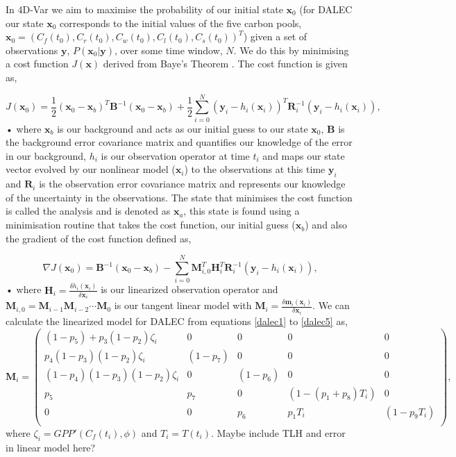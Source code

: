 \documentclass[11pt]{article}
\begin{document}
In 4D-Var we aim to maximise the probability of our initial state $\textbf{x}_0$ (for DALEC our state $\textbf{x}_0$ corresponds to the initial values of the five carbon pools,  $\textbf{x}_0 = (C_f(t_0), C_r(t_0), C_w(t_0), C_l(t_0), C_s(t_0))^T$) given a set of observations $\textbf{y}$, $P(\textbf{x}_0|\textbf{y})$, over some time window, $N$. We do this by minimising a cost function $J(\textbf{x})$ derived from Baye's Theorem \cite{lewis2006dynamic}. The cost function is given as,

\begin{equation}
J(\textbf{x}_0) = \frac{1}{2}(\textbf{x}_0-\textbf{x}_b)^{T}\textbf{B}^{-1}(\textbf{x}_0-\textbf{x}_b)+\frac{1}{2}\sum_{i=0}^{N}(\textbf{y}_i-h_i(\textbf{x}_i))^{T}\textbf{R}_{i}^{-1}(\textbf{y}_i-h_i(\textbf{x}_i)),
\end{equation}•
where $\textbf{x}_b$ is our background and acts as our initial guess to our state $\textbf{x}_0$, $\textbf{B}$ is the background error covariance matrix and quantifies our knowledge of the error in our background, $h_i$ is our observation operator at time $t_i$ and maps our state vector evolved by our nonlinear model ($\textbf{x}_i$) to the observations at this time $\textbf{y}_i$ and $\textbf{R}_i$ is the observation error covariance matrix and represents our knowledge of the uncertainty in the observations. The state that minimises the cost function is called the analysis and is denoted as $\textbf{x}_a$, this state is found using a minimisation routine that takes the cost function, our initial guess ($\textbf{x}_b$) and also the gradient of the cost function defined as,

\begin{equation}
\nabla J(\textbf{x}_0) = \textbf{B}^{-1}(\textbf{x}_0-\textbf{x}_b)-\sum_{i=0}^{N}\textbf{M}_{i,0}^{T}\textbf{H}_i^{T}\textbf{R}_{i}^{-1}(\textbf{y}_i-h_i(\textbf{x}_i)),
\end{equation}•
where $\textbf{H}_i = \frac{\delta h_i(\textbf{x}_i)}{\delta\textbf{x}_i}$ is our linearized observation operator and $\mathbf{M}_{i,0}=\mathbf{M}_{i-1}\mathbf{M}_{i-2}\cdots\mathbf{M}_0$ is our tangent linear model with $\mathbf{M}_i=\frac{\delta \textbf{m}_i(\textbf{x}_i)}{\delta \textbf{x}_i}$. We can calculate the linearized model for DALEC from equations \ref{dalec1} to \ref{dalec5} as,
\begin{equation}
\mathbf{M}_{i}= 
\begin{pmatrix} 
(1-p_5)+p_3(1-p_2)\zeta_i & 0 & 0 & 0 & 0 \\
p_4(1-p_3)(1-p_2)\zeta_i & (1-p_7) & 0 & 0 & 0 \\
(1-p_4)(1-p_3)(1-p_2)\zeta_i & 0 & (1-p_6) & 0 & 0 \\
p_5 & p_7 & 0 & (1-(p_1+p_8)T_i) & 0 \\
0 & 0 & p_6 & p_1T_i & (1-p_9T_i) \\
\end{pmatrix}, \label{linmod}
\end{equation}
where $\zeta_i = GPP'(C_f(t_i), \phi)$ and $T_{i}=T(t_i)$. {\color{red} Maybe include TLH and error in linear model here?}
\end{document}
